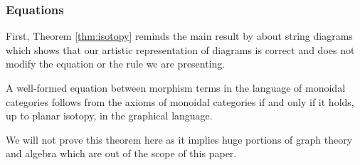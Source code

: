 \documentclass[math, english, info]{cours}
\begin{document}
\subsubsection{Equations}
\label{subsubsec:sdq}
First, Theorem \ref{thm:isotopy} reminds the main result by  about string diagrams which shows that our artistic representation of diagrams is correct and does not modify the equation or the rule we are presenting.
\begin{thm}
	\label{thm:isotopy}
	A well-formed equation between morphism terms in the language of monoidal categories follows from the axioms of monoidal categories if and only if it holds, up to planar isotopy, in the graphical language.
\end{thm}
We will not prove this theorem here as it implies huge portions of graph theory and algebra which are out of the scope of this paper.

\medskip
\end{document}

